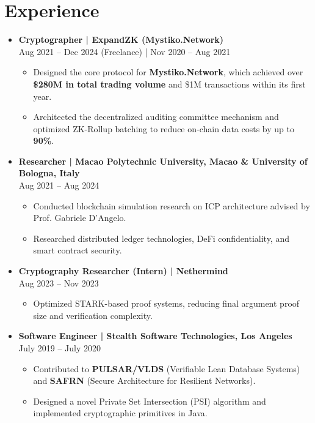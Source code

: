 \documentclass[a4paper,12pt]{article}
\begin{document}
\section*{Experience}
\begin{itemize}[left=0pt, label={}, itemsep=8pt]
    \item \textbf{Cryptographer | ExpandZK (Mystiko.Network)} \\
    Aug 2021 -- Dec 2024 (Freelance) | Nov 2020 -- Aug 2021
    \begin{itemize}[left=0pt,label=\textbullet,topsep=2pt]
        \item Designed the core protocol for \textbf{Mystiko.Network}, which achieved over \textbf{\$280M in total trading volume} and \$1M transactions within its first year.
        \item Architected the decentralized auditing committee mechanism and optimized ZK-Rollup batching to reduce on-chain data costs by up to \textbf{90\%}.
    \end{itemize}

    \item \textbf{Researcher | Macao Polytechnic University, Macao \& University of Bologna, Italy} \\
    Aug 2021 -- Aug 2024
    \begin{itemize}[left=0pt,label=\textbullet,topsep=2pt]
        \item Conducted blockchain simulation research on ICP architecture advised by Prof. Gabriele D'Angelo.
        \item Researched distributed ledger technologies, DeFi confidentiality, and smart contract security.
    \end{itemize}

    \item \textbf{Cryptography Researcher (Intern) | Nethermind} \\
    Aug 2023 -- Nov 2023
    \begin{itemize}[left=0pt,label=\textbullet,topsep=2pt]
        \item Optimized STARK-based proof systems, reducing final argument proof size and verification complexity.
    \end{itemize}

    \item \textbf{Software Engineer | Stealth Software Technologies, Los Angeles} \\
    July 2019 -- July 2020
    \begin{itemize}[left=0pt,label=\textbullet,topsep=2pt]
        \item Contributed to \textbf{PULSAR/VLDS} (Verifiable Lean Database Systems) and \textbf{SAFRN} (Secure Architecture for Resilient Networks).
        \item Designed a novel Private Set Intersection (PSI) algorithm and implemented cryptographic primitives in Java.
    \end{itemize}


\end{itemize}
\end{document}
